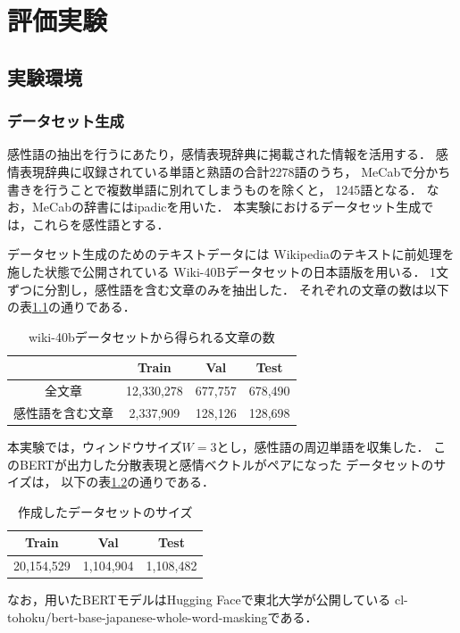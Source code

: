 \chapter{評価実験}

\label{chap:evaluation}

\section{実験環境}
	\subsection{データセット生成}
		感性語の抽出を行うにあたり，感情表現辞典に掲載された情報を活用する．
		感情表現辞典に収録されている単語と熟語の合計2278語のうち，
		MeCabで分かち書きを行うことで複数単語に別れてしまうものを除くと，
		1245語となる．
		なお，MeCabの辞書にはipadicを用いた．
		本実験におけるデータセット生成では，これらを感性語とする．

		データセット生成のためのテキストデータには
		Wikipedia\cite{wikipedia}のテキストに前処理を施した状態で公開されている
		Wiki-40B\cite{wiki-40b}データセットの日本語版を用いる．
		1文ずつに分割し，感性語を含む文章のみを抽出した．
		それぞれの文章の数は以下の表\ref{table:wiki40b_sentence}の通りである．
		\begin{table}[H]
			\centering
			\caption{wiki-40bデータセットから得られる文章の数}
			\label{table:wiki40b_sentence}
			\begin{tabular}{cccc}
				\hline
				& Train & Val & Test \\
				\hline \hline
				全文章 & 12,330,278 & 677,757 & 678,490 \\
				感性語を含む文章 & 2,337,909 & 128,126 & 128,698 \\
				\hline
			\end{tabular}
		\end{table}
		本実験では，ウィンドウサイズ$W=3$とし，感性語の周辺単語を収集した．
		このBERTが出力した分散表現と感情ベクトルがペアになった
		データセットのサイズは，
		以下の表\ref{table:bert_to_emo_size}の通りである．
		\begin{table}[H]
			\centering
			\caption{作成したデータセットのサイズ}
			\label{table:bert_to_emo_size}
			\begin{tabular}{ccc}
				\hline
				Train & Val & Test \\
				\hline \hline
				20,154,529 & 1,104,904 & 1,108,482 \\
				\hline
			\end{tabular}
		\end{table}
		なお，用いたBERTモデルはHugging Face\cite{huggingface}で東北大学が公開している
		cl-tohoku/bert-base-japanese-whole-word-masking\cite{cl-tohoku}である．

